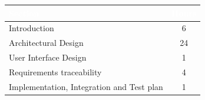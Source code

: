\begin{table}[h!]
    \centering
    \begin{tabular}{|l|c|}
        \hline
        \rowcolor[HTML]{5C8A99}
        \textbf{\textcolor{white}{Section}} & \textbf{\textcolor{white}{Hours}} \\ \hline
        Introduction                       & 6     \\ \hline
        Architectural Design               & 24     \\ \hline
        User Interface Design              & 1    \\ \hline
        Requirements traceability          & 4     \\ \hline
        Implementation, Integration and Test plan & 1    \\ \hline
    \end{tabular}
\end{table}